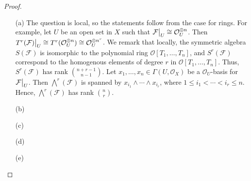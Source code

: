 \documentclass{article}
\newcommand{\fF}{\mathcal{F}}
\newcommand{\fO}{\mathcal{O}}
\newcommand\restr[2]{{%
  \left.\kern-\nulldelimiterspace %
  #1 %
  \vphantom{\big|} %
  \right|_{#2} %
}}
\begin{document}
\begin{enumerate} [label=\textbf{\arabic*.}, leftmargin=0em]
\begin{proof} $ $ \vspace{0pt}
\begin{itemize} [leftmargin=0cm]
\item[(a)] The question is local, so the statements follow from the case for rings. For example, let $U$ be an open set in $X$ such that $\restr{\fF}{U} \cong \fO_U^{\oplus n}$. Then $\restr{T^r(\fF)}{U} \cong T^r(\fO_U^{\oplus n}) \cong \fO_U^{\oplus n^r}$. We remark that locally, the symmetric algebra $S(\fF)$ is isomorphic to the polynomial ring $\fO[T_1, \dots, T_n]$, and $S^r(\fF)$ correspond to the homogenous elements of degree $r$ in $\fO[T_1, \dots, T_n]$. Thus, $S^r(\fF)$ has rank ${n + r - 1 \choose n - 1}$. Let $x_1, \dots, x_n \in \Gamma(U, \fO_X)$ be a $\fO_U$-basis for $\restr{\fF}{U}$. Then $\bigwedge^r(\fF)$ is spanned by $x_{i_1} \wedge \cdots \wedge x_{i_r}$, where $1 \leq i_1 < \cdots < i_r \leq n$. Hence, $\bigwedge^r(\fF)$ has rank ${n \choose r}$.

\item[(b)] 

\item[(c)]

\item[(d)]

\item[(e)]

\end{itemize}
\end{proof}

\end{enumerate}
\end{document}
